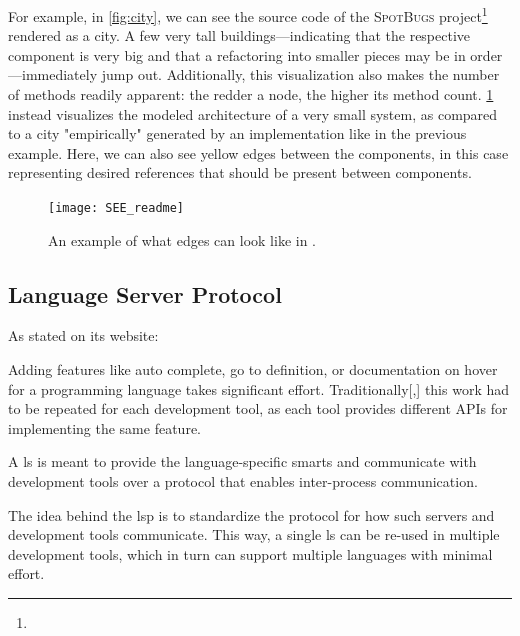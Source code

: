 \documentclass[../thesis]{subfiles}
\begin{document}
For example, in \cref{fig:city}, we can see the source code of the \textsc{SpotBugs} project\footnote{} rendered as a \gls{city}.
A few very tall buildings---indicating that the respective component is very big and that a refactoring into smaller pieces may be in order---immediately jump out.
Additionally, this visualization also makes the number of methods readily apparent:
the redder a node, the higher its method count.
\cref{fig:edges} instead visualizes the modeled architecture of a very small system, as compared to a city "empirically" generated by an implementation like in the previous example.
Here, we can also see yellow edges between the components, in this case representing desired references that should be present between components.

\begin{figure}[hbtp]
	\begin{center}
		\texttt{[image: SEE\_readme]}
	\end{center}
	\caption{An example of what edges can look like in \SEE{}. }\label{fig:edges}
\end{figure}

\subsection{Language Server Protocol}\label{subsec:lsp}

As stated on its website:
\begin{displayquote}
	Adding features like auto complete, go to definition, or documentation on hover for a programming language takes significant effort. Traditionally[,] this work had to be repeated for each development tool, as each tool provides different APIs for implementing the same feature.

	A \gls*{ls} is meant to provide the language-specific smarts and communicate with development tools over a protocol that enables inter-process communication.

	The idea behind the \gls*{lsp} is to standardize the protocol for how such servers and development tools communicate. This way, a single \gls{ls} can be re-used in multiple development tools, which in turn can support multiple languages with minimal effort.
\end{displayquote}
\end{document}
